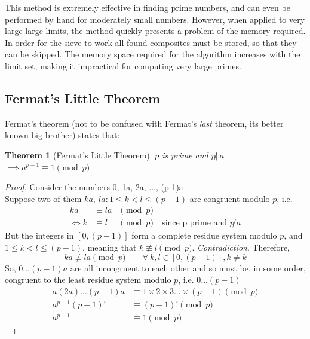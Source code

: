 \documentclass[12pt, titlepage]{article}
\newtheorem{theorem}{Theorem}
\begin{document}
    This method is extremely effective in finding prime numbers, and can even be
    performed by hand for moderately small numbers. However, when applied to
    very large large limits, the method quickly presents a problem of the memory
    required. In order for the sieve to work all found composites must be
    stored, so that they can be skipped. The memory space required for the
    algorithm increases with the limit set, making it impractical for computing
    very large primes.

    \subsection{Fermat's  Little Theorem}
    Fermat's theorem (not to be confused with Fermat's \emph{last} theorem, its
    better known big brother) states that:
    \begin{theorem}[Fermat's Little Theorem]
        $p$ is prime and $p \not|\ a$ $\implies a^{p-1} \equiv 1 \pmod{p}$
    \end{theorem}

    \begin{proof}
        Consider the numbers 0, 1a, 2a, ..., (p-1)a\\
        Suppose two of them $ka,\ la: 1\leq k < l \leq (p-1)$ are congruent
        modulo $p$, i.e. 
        \begin{align*}
                  ka &\equiv la &\pmod{p}&\\
            \iff  k  &\equiv l  &\pmod{p}&\ \text{since p prime and $p \not| a$}
        \end{align*}
        But the integers in $[0, (p-1)]$ form a complete residue system modulo
        $p$, and  $1 \leq k<l \leq (p-1)$, 
        meaning that $k \not\equiv l \pmod p$. \emph{Contradiction}. Therefore, 
        \begin{equation*}
            ka \not\equiv la \pmod{p}\qquad \forall\ k,l \in [0, (p-1)], k \not= k
        \end{equation*}    
        So, $0...(p-1)a$ are all incongruent to each other and so must be, in
        some order, congruent to the least residue system modulo $p$, i.e.
        $0...(p-1)$
        \begin{align*}
            a(2a)...(p-1)a &\equiv 1\times 2\times 3...\times (p-1) \pmod{p}\\
            a^{p-1}(p-1)!  &\equiv (p-1)!                           \pmod{p}\\
            a^{p-1}        &\equiv 1                                \pmod{p}
        \end{align*}
    \end{proof}
            
\end{document}
